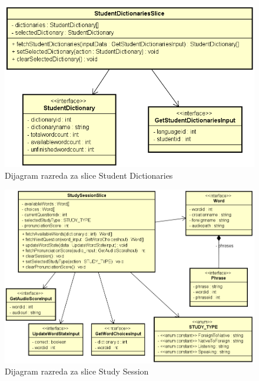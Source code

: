 \begin{figure}[htp]
	\includegraphics[scale=0.6]{dijagrami/StudentDictionariesSlice.png}
	\centering
	\caption{Dijagram razreda za slice Student Dictionaries}
	\label{fig:cls-student-dict}
\end{figure}

\begin{figure}[htp]
	\includegraphics[scale=0.5]{dijagrami/StudySessionSlice.png}
	\centering
	\caption{Dijagram razreda za slice Study Session}
	\label{fig:cls-study-sesion}
\end{figure}

